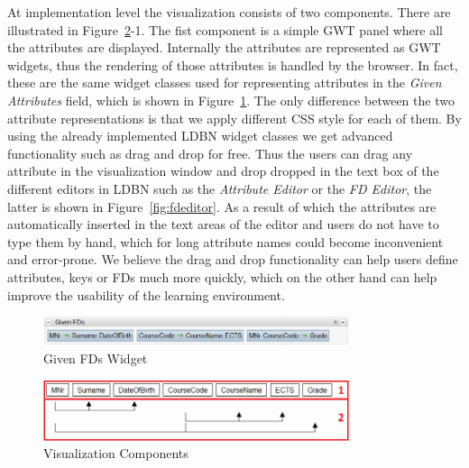At implementation level the visualization consists of two components. 
There are illustrated in Figure~\ref{fig:impl-fds01}-1.
The fist component is a simple GWT panel where all the attributes are displayed. Internally 
the attributes are represented as GWT widgets, thus the rendering of those attributes is
handled by the browser. In fact, these are the same widget classes used for representing
attributes in the \emph{Given Attributes} field, which is shown in Figure~\ref{fig:givenFds}. The only 
difference between the two attribute representations is 
that we apply different CSS style for each of them. By using the already implemented LDBN 
widget classes we get advanced functionality such as drag and drop for free. Thus the users
can drag any attribute in the visualization window and drop 
dropped in the text box of the different editors in LDBN
such as the \emph{Attribute Editor} or the \emph{FD Editor}, the latter is 
shown in Figure~\ref{fig:fdeditor}. 
As a result of which the
attributes are automatically inserted in the text areas of the editor and users do not have
to type them by hand, which for long attribute names could become inconvenient and error-prone. 
We believe the drag and drop functionality can help
users define attributes, keys or FDs much more quickly, which on the other hand can
help improve the usability of the learning environment.

\begin{figure}[h]
	\begin{center}
		\includegraphics[width=0.8\textwidth]{./img/givenFds.png}
		\caption{Given FDs Widget}
		\label{fig:givenFds}
	\end{center}
\end{figure}

\begin{figure}[h]
	\begin{center}
		\includegraphics[width=0.8\textwidth]{./img/impl-fds01.png}
		\caption{Visualization Components}
		\label{fig:impl-fds01}
	\end{center}
\end{figure}

